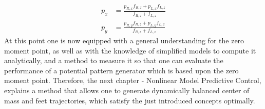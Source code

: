 \begin{align}
	p_x &= \frac{p_{R,x}f_{R,z}+p_{L,x}f_{L,z}}{f_{R,z}+f_{L,z}} 
	\label{eq::21_double_zmp_x} \\
	p_y &= \frac{p_{R,y}f_{R,z}+p_{L,y}f_{L,z}}{f_{R,z}+f_{L,z}}
	\label{eq::21_double_zmp_y}
\end{align}
At this point one is now equipped with a general understanding for the zero moment point, as well as with the knowledge of simplified models to compute it analytically, and a method to measure it so that one can evaluate the performance of a potential pattern generator which is based upon the zero moment point. Therefore, the next chapter - Nonlinear Model Predictive Control, explains a method that allows one to generate dynamically balanced center of mass and feet trajectories, which satisfy the just introduced concepts optimally.
